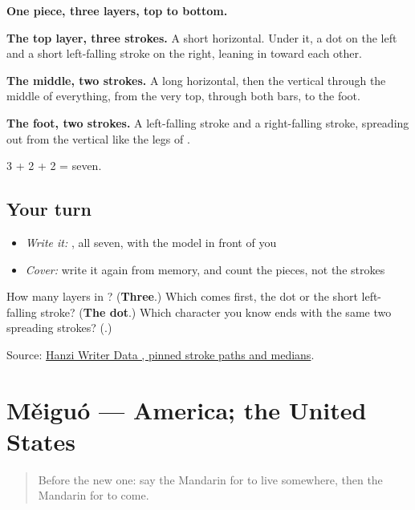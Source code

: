 \begin{quote}
\end{quote}

\textbf{One piece, three layers, top to bottom.}

\textbf{The top layer, three strokes.} A short horizontal. Under it, a dot on the left and a short left-falling stroke on the right, leaning in toward each other.

\textbf{The middle, two strokes.} A long horizontal, then the vertical through the middle of everything, from the very top, through both bars, to the foot.

\textbf{The foot, two strokes.} A left-falling stroke and a right-falling stroke, spreading out from the vertical like the legs of .

3 + 2 + 2 = seven.

\subsection*{Your turn}
\begin{itemize}
\raggedright
  \item \emph{Write it:} , all seven, with the model in front of you
  \item \emph{Cover:} write it again from memory, and count the pieces, not the strokes
\end{itemize}

\begin{tcolorbox}[breakable,colback=teal!4,colframe=teal!35!black,title={Before you move on}]
How many layers in ? (\textbf{Three}.) Which comes first, the dot or the short left-falling stroke? (\textbf{The dot}.) Which character you know ends with the same two spreading strokes? (\textbf{}.)

Source: \href{https://raw.githubusercontent.com/chanind/hanzi-writer-data/68d10a4b21150cae5e1ebbd223eed289cf32d90c/data/\%E6\%9D\%A5.json}{Hanzi Writer Data , pinned stroke paths and medians}.
\end{tcolorbox}
\section[Měiguó]{Měiguó — America; the United States}

\label{lesson:ZH-C36-meiguo}



\begin{quote}
Before the new one: say the Mandarin for to live somewhere, then the Mandarin for to come.
\end{quote}

